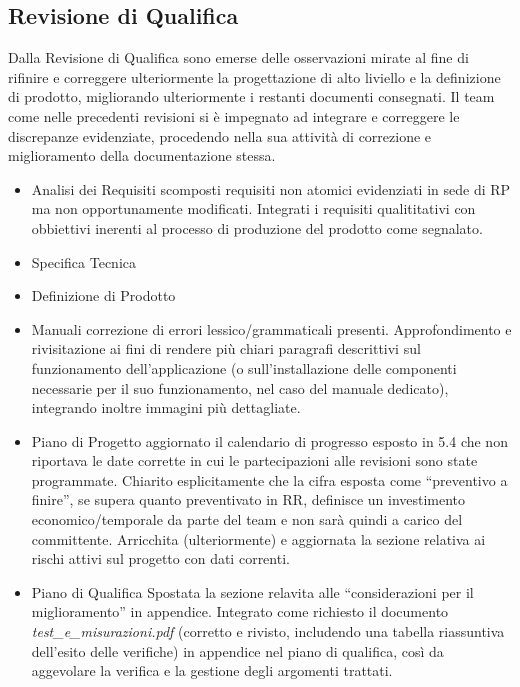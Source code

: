 \subsection{Revisione di Qualifica}
Dalla Revisione di Qualifica sono emerse delle osservazioni mirate al fine di rifinire e correggere ulteriormente la progettazione di alto liviello e la definizione di prodotto, migliorando ulteriormente i restanti documenti consegnati. Il team come nelle precedenti revisioni si è impegnato ad integrare e correggere le discrepanze evidenziate, procedendo nella sua attività di correzione e miglioramento della documentazione stessa.
\begin{itemize}
\item{Analisi dei Requisiti} scomposti requisiti non atomici evidenziati in sede di RP ma non opportunamente modificati. Integrati i requisiti qualititativi con obbiettivi inerenti al processo di produzione del prodotto come segnalato.
\item{Specifica Tecnica} 
\item{Definizione di Prodotto}
\item{Manuali} correzione di errori lessico/grammaticali presenti. Approfondimento e rivisitazione ai fini di rendere più chiari paragrafi descrittivi sul funzionamento dell'applicazione (o sull'installazione delle componenti necessarie per il suo funzionamento, nel caso del manuale dedicato), integrando inoltre immagini più dettagliate. 
\item{Piano di Progetto} aggiornato il calendario di progresso esposto in 5.4 che non riportava le date corrette in cui le partecipazioni alle revisioni sono state programmate. Chiarito esplicitamente che la cifra esposta come ``preventivo a finire'', se supera quanto preventivato in RR, definisce un investimento economico/temporale da parte del team e non sarà quindi a carico del committente. Arricchita (ulteriormente) e aggiornata la sezione relativa ai rischi attivi sul progetto con dati correnti.
\item{Piano di Qualifica} Spostata la sezione relavita alle ``considerazioni per il miglioramento'' in appendice. Integrato come richiesto il documento \textit{test\_e\_misurazioni.pdf} (corretto e rivisto, includendo una tabella riassuntiva dell'esito delle verifiche) in appendice nel piano di qualifica, così da aggevolare la verifica e la gestione degli argomenti trattati.
\end{itemize}


